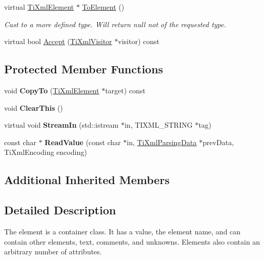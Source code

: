\begin{DoxyCompactItemize}
virtual \hyperlink{class_ti_xml_element}{Ti\+Xml\+Element} $\ast$ \hyperlink{class_ti_xml_element_a9def86337ea7a755eb41cac980f60c7a}{To\+Element} ()
\begin{DoxyCompactList}\small\item\em Cast to a more defined type. Will return null not of the requested type. \end{DoxyCompactList}\item 
virtual bool \hyperlink{class_ti_xml_element_a01d33358cce9d1817b557d314dda3779}{Accept} (\hyperlink{class_ti_xml_visitor}{Ti\+Xml\+Visitor} $\ast$visitor) const
\end{DoxyCompactItemize}
\subsection*{Protected Member Functions}
\begin{DoxyCompactItemize}
\item 
\mbox{\label{class_ti_xml_element_ab931f2208ed76ba03465d8a1f86b5935}} 
void {\bfseries Copy\+To} (\hyperlink{class_ti_xml_element}{Ti\+Xml\+Element} $\ast$target) const
\item 
\mbox{\label{class_ti_xml_element_a5670933ec2d7d9763b9891acc05d7f7d}} 
void {\bfseries Clear\+This} ()
\item 
\mbox{\label{class_ti_xml_element_a6884b491fb4708dae566f3ddc1476536}} 
virtual void {\bfseries Stream\+In} (std\+::istream $\ast$in, T\+I\+X\+M\+L\+\_\+\+S\+T\+R\+I\+NG $\ast$tag)
\item 
\mbox{\label{class_ti_xml_element_ac786bce103042d3837c4cc2ff6967d41}} 
const char $\ast$ {\bfseries Read\+Value} (const char $\ast$in, \hyperlink{class_ti_xml_parsing_data}{Ti\+Xml\+Parsing\+Data} $\ast$prev\+Data, Ti\+Xml\+Encoding encoding)
\end{DoxyCompactItemize}
\subsection*{Additional Inherited Members}


\subsection{Detailed Description}
The element is a container class. It has a value, the element name, and can contain other elements, text, comments, and unknowns. Elements also contain an arbitrary number of attributes. 

